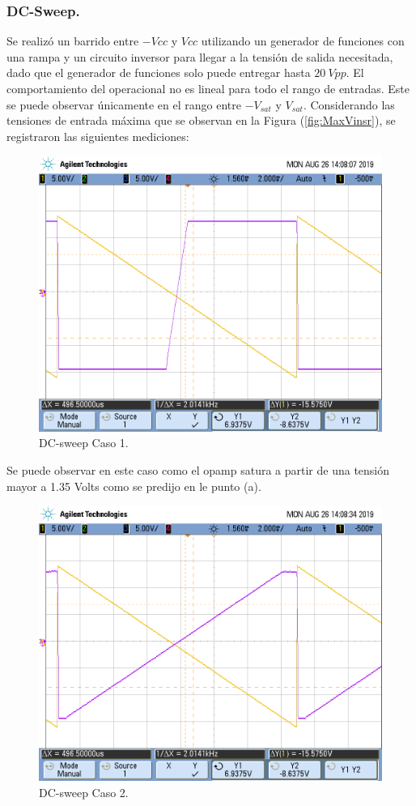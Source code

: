 \subsubsection{DC-Sweep.}
Se realizó un barrido entre $-Vcc$ y $Vcc$ utilizando un generador de funciones con una rampa y un circuito inversor para llegar a la tensión de salida necesitada, dado que el generador de funciones solo puede entregar hasta $20 \ Vpp$.
El comportamiento del operacional no es lineal para todo el rango de entradas. Este se puede observar únicamente en el rango entre $-V_{sat}$ y $V_{sat}$. Considerando las tensiones de entrada máxima que se observan en la Figura (\ref{fig:MaxVinsr}), se registraron las siguientes mediciones:
\begin{figure}[H]	
	\centering
	\includegraphics[width=\textwidth]{Ejercicio1/Imagenes/dc_sweep_c1.png}
	\caption{DC-sweep Caso 1.}
	\label{fig:dcc1}
\end{figure} 
Se puede observar en este caso como el opamp satura a partir de una tensión mayor a 1.35 Volts como se predijo en le punto (a).
\begin{figure}[H]	
	\centering
	\includegraphics[width=\textwidth]{Ejercicio1/Imagenes/dc_sweep_c2.png}
	\caption{DC-sweep Caso 2.}
	\label{fig:dcc2}
\end{figure} 
